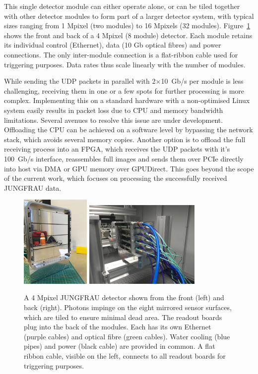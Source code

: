 \documentclass[a4paper]{article}
\begin{document}
This single detector module can either operate alone, or can be tiled together with other detector modules to form part of a larger detector system, with typical sizes ranging from 1 Mpixel (two modules) to 16 Mpixels (32 modules). Figure~\ref{fig:jfdetector} shows the front and back of a 4 Mpixel (8 module) detector. Each module retains its individual control (Ethernet), data (10 Gb optical fibres) and power connections. The only inter-module connection is a flat-ribbon cable used for triggering purposes. Data rates thus scale linearly with the number of modules.

While sending the UDP packets in parallel with 2$\times$10~Gb/s per module is less challenging, receiving them in one or a few spots for further processing is more complex. Implementing this on a standard hardware with a non-optimised Linux system easily results in packet loss due to CPU and memory bandwidth limitations. Several avenues to resolve this issue are under development. Offloading the CPU can be achieved on a software level by bypassing the network stack, which avoids several memory copies. Another option is to offload the full receiving process into an FPGA, which receives the UDP packets with it's 100~Gb/s interface, reassembles full images and sends them over PCIe directly into host via DMA or GPU memory over GPUDirect. This goes beyond the scope of the current work, which focuses on processing the successfully received JUNGFRAU data.

\begin{figure}[h!]
\centering
\includegraphics[width=0.30\textwidth]{jungfraudetector.jpg}
\hfill
\includegraphics[width=0.50\textwidth]{JF4M_back.jpg}
\caption{A 4 Mpixel JUNGFRAU detector shown from the front (left) and back (right). Photons impinge on the eight mirrored sensor surfaces, which are tiled to ensure minimal dead area. The readout boards plug into the back of the modules. Each has its own Ethernet (purple cables) and optical fibre (green cables). Water cooling (blue pipes) and power (black cable) are provided in common. A flat ribbon cable, visible on the left, connects to all readout boards for triggering purposes.}
\label{fig:jfdetector}
\end{figure}
\end{document}
